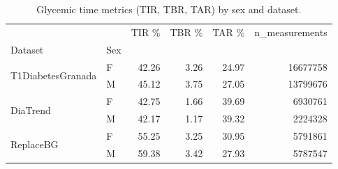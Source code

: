 \begin{table}
\caption{Glycemic time metrics (TIR, TBR, TAR) by sex and dataset.}
\label{tab:glycemic_sex}
\begin{tabular}{llrrrr}
\toprule
 &  & TIR \% & TBR \% & TAR \% & n\_measurements \\
Dataset & Sex &  &  &  &  \\
\midrule
\multirow[t]{2}{*}{T1DiabetesGranada} & F & 42.26 & 3.26 & 24.97 & 16677758 \\
 & M & 45.12 & 3.75 & 27.05 & 13799676 \\
\cline{1-6}
\multirow[t]{2}{*}{DiaTrend} & F & 42.75 & 1.66 & 39.69 & 6930761 \\
 & M & 42.17 & 1.17 & 39.32 & 2224328 \\
\cline{1-6}
\multirow[t]{2}{*}{ReplaceBG} & F & 55.25 & 3.25 & 30.95 & 5791861 \\
 & M & 59.38 & 3.42 & 27.93 & 5787547 \\
\cline{1-6}
\bottomrule
\end{tabular}
\end{table}
